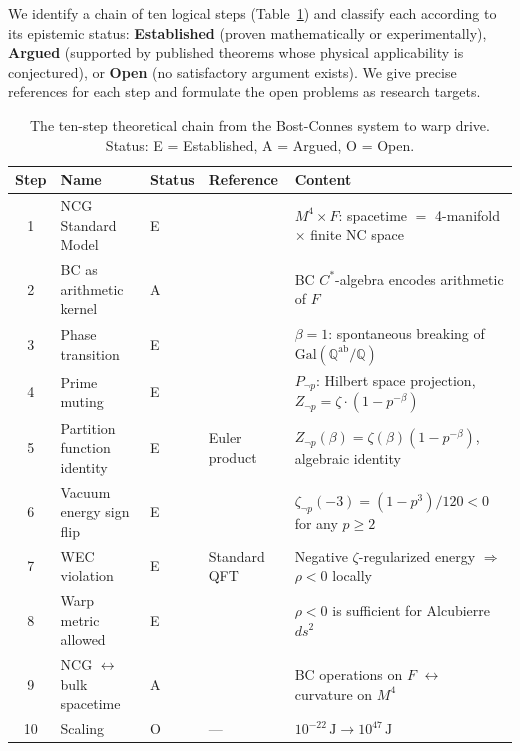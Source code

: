 \documentclass[aps,prd,twocolumn,superscriptaddress,nofootinbib]{revtex4-2}
\newcommand{\Gal}{\mathrm{Gal}}
\begin{document}
We identify a chain of ten logical steps (Table~\ref{tab:chain})
and classify each according to its epistemic status:
\textbf{Established} (proven mathematically or experimentally),
\textbf{Argued} (supported by published theorems whose physical
applicability is conjectured), or \textbf{Open} (no satisfactory
argument exists). We give precise references for each step and
formulate the open problems as research targets.

\begin{table}[t]
\centering
\caption{The ten-step theoretical chain from the Bost-Connes system
to warp drive. Status: E = Established, A = Argued, O = Open.}
\label{tab:chain}
\begin{tabular}{@{}clllp{5.5cm}@{}}
\toprule
Step & Name & Status & Reference & Content \\
\midrule
1 & NCG Standard Model & E & \cite{Connes1996,CCM2007} & $M^4 \times F$: spacetime $=$ 4-manifold $\times$ finite NC space \\
2 & BC as arithmetic kernel & A & \cite{ConnesMarcolli2006} & BC $C^*$-algebra encodes arithmetic of $F$ \\
3 & Phase transition & E & \cite{BostConnes1995} & $\beta = 1$: spontaneous breaking of $\Gal(\mathbb{Q}^{\mathrm{ab}}/\mathbb{Q})$ \\
4 & Prime muting & E & \cite{paper_A} & $P_{\neg p}$: Hilbert space projection, $Z_{\neg p} = \zeta \cdot (1-p^{-\beta})$ \\
5 & Partition function identity & E & Euler product & $Z_{\neg p}(\beta) = \zeta(\beta)(1-p^{-\beta})$, algebraic identity \\
6 & Vacuum energy sign flip & E & \cite{paper_A} & $\zeta_{\neg p}(-3) = (1-p^3)/120 < 0$ for any $p \geq 2$ \\
7 & WEC violation & E & Standard QFT & Negative $\zeta$-regularized energy $\Rightarrow$ $\rho < 0$ locally \\
8 & Warp metric allowed & E & \cite{Alcubierre1994} & $\rho < 0$ is sufficient for Alcubierre $ds^2$ \\
9 & NCG $\leftrightarrow$ bulk spacetime & A & \cite{ConnesMarcolli2006,Maldacena1998} & BC operations on $F$ $\leftrightarrow$ curvature on $M^4$ \\
10 & Scaling & O & --- & $10^{-22}\,\mathrm{J} \to 10^{47}\,\mathrm{J}$ \\
\bottomrule
\end{tabular}
\end{table}

\end{document}
